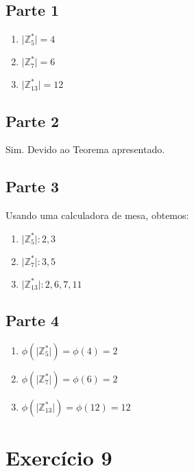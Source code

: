 \documentclass[a4paper]{article}
\begin{document}
\subsection{Parte 1}

\begin{enumerate}
\item $\vert\mathbb{Z}_{5}^{*}\vert = 4$

\item $\vert\mathbb{Z}_{7}^{*}\vert = 6$

\item $\vert\mathbb{Z}_{13}^{*}\vert = 12$
\end{enumerate}

\subsection{Parte 2}

Sim. Devido ao Teorema apresentado.

\subsection{Parte 3}

Usando uma calculadora de mesa, obtemos:

\begin{enumerate}
\item $\vert\mathbb{Z}_{5}^{*}\vert: 2, 3$

\item $\vert\mathbb{Z}_{7}^{*}\vert: 3, 5$

\item $\vert\mathbb{Z}_{13}^{*}\vert:2, 6, 7, 11$
\end{enumerate}

\subsection{Parte 4}


\begin{enumerate}
\item $\phi(\vert\mathbb{Z}_{5}^{*}\vert) = \phi(4) = 2$

\item $\phi(\vert\mathbb{Z}_{7}^{*}\vert) = \phi(6) = 2$

\item $\phi(\vert\mathbb{Z}_{13}^{*}\vert) = \phi(12) = 12$
\end{enumerate}


\section{Exercício 9}\label{sec:Ex9}
\end{document}
